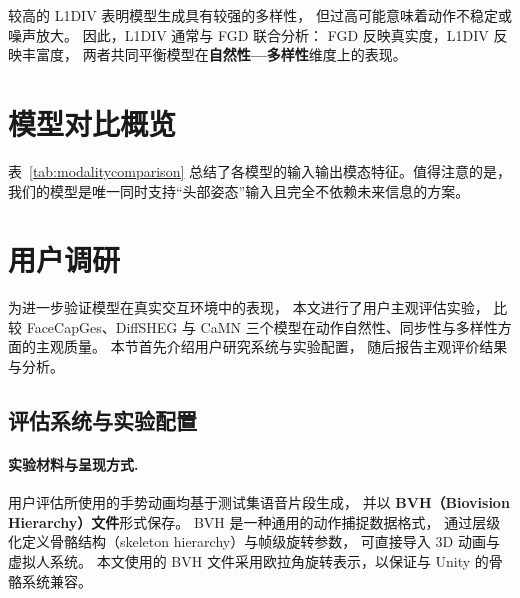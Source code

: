 较高的 L1DIV 表明模型生成具有较强的多样性，
但过高可能意味着动作不稳定或噪声放大。
因此，L1DIV 通常与 FGD 联合分析：  
FGD 反映真实度，L1DIV 反映丰富度，
两者共同平衡模型在\textbf{自然性—多样性}维度上的表现。

\section{模型对比概览}

表~\ref{tab:modalitycomparison} 总结了各模型的输入输出模态特征。值得注意的是，我们的模型是唯一同时支持“头部姿态”输入且完全不依赖未来信息的方案。

\begin{table}[h]
\centering
{}
\caption{各模型使用的输入与输出模态。$\checkmark$：使用；$\times$：未使用；$\ast$：未显式使用说话人 ID，但为每个说话人单独训练模型。}
\label{tab:modalitycomparison}
\end{table}

\section{用户调研}
\label{sec:userstudy}

为进一步验证模型在真实交互环境中的表现，
本文进行了用户主观评估实验，
比较 FaceCapGes、DiffSHEG \cite{diffsheg} 与 CaMN \cite{beatcamn} 三个模型在动作自然性、同步性与多样性方面的主观质量。
本节首先介绍用户研究系统与实验配置，
随后报告主观评价结果与分析。

\subsection{评估系统与实验配置}

\paragraph{实验材料与呈现方式.}
用户评估所使用的手势动画均基于测试集语音片段生成，
并以 \textbf{BVH（Biovision Hierarchy）文件}形式保存。
BVH 是一种通用的动作捕捉数据格式，
通过层级化定义骨骼结构（skeleton hierarchy）与帧级旋转参数，
可直接导入 3D 动画与虚拟人系统。
本文使用的 BVH 文件采用欧拉角旋转表示，以保证与 Unity 的骨骼系统兼容。

